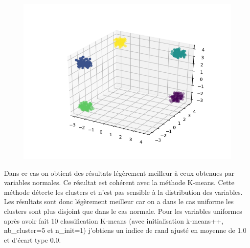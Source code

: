 \documentclass[12pt]{scrartcl} %
\begin{document}
\begin{figure}[!h]
 \centering 
\includegraphics[scale=.3]{uniform_lagKmeans.png}
\end{figure}
\newline
Dans ce cas on obtient des résultats légèrement meilleur à ceux obtenues par variables normales. Ce résultat est cohérent avec la méthode K-means. Cette méthode détecte les clusters et n'est pas sensible à la distribution des variables. Les résultats sont donc légèrement meilleur car on a  dans le cas uniforme les clusters sont plus disjoint que dans le cas normale. Pour les variables uniformes après avoir fait 10 classification K-means (avec initialisation k-means++, nb\_cluster=5 et n\_init=1) j'obtiens un indice de rand ajusté en moyenne de 1.0 et d'écart type 0.0.
\end{document}

